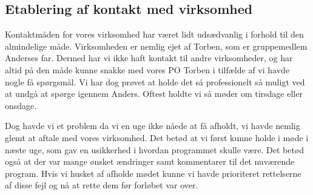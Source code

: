 \subsection{Etablering af kontakt med virksomhed}

Kontaktmåden for vores virksomhed har været lidt udsædvanlig i forhold til den almindelige måde. Virksomheden er nemlig ejet  af Torben, som er gruppemedlem Anderses far. Dermed har vi ikke haft kontakt til andre virksomheder, og har altid på den måde kunne snakke med vores PO Torben i tilfælde af vi havde nogle få spørgsmål. Vi har dog prøvet at holde det så professionelt så muligt ved at undgå at spørge igennem Anders. Oftest holdte vi så møder om tirsdage eller onsdage.

Dog havde vi et problem da vi en uge ikke nåede at få afholdt, vi havde nemlig glemt at aftale med vores virksomhed. Det betød at vi først kunne holde i møde i næste uge, som gav en usikkerhed i hvordan programmet skulle være. Det betød også at der var mange ønsket ændringer samt kommentarer til det nuværende program. Hvis vi husket af afholde mødet kunne vi havde prioriteret rettelserne af disse fejl og nå at rette dem før forløbet var over.